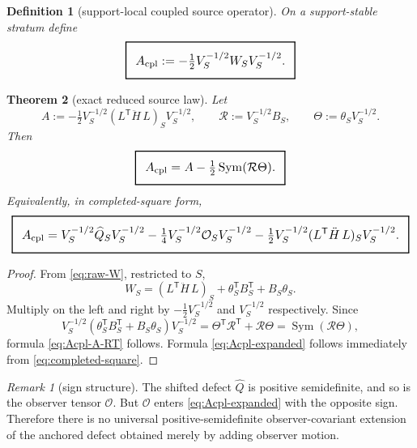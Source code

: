 \documentclass[11pt,a4paper]{article}
\numberwithin{equation}{section}
\DeclareMathOperator{\Sym}{Sym}
\newcommand{\geomboxed}[1]{%
  \setlength{\fboxsep}{8pt}%
  \setlength{\fboxrule}{0.9pt}%
  \fbox{\scalebox{1.10}{$\displaystyle #1$}}%
}
\theoremstyle{thmcompact}
\newtheorem{theorem}{Theorem}[section]
\newtheorem{definition}[theorem]{Definition}
\theoremstyle{remark}
\newtheorem*{remarkplain}{Remark}
\newenvironment{remark}[1][]%
{\begin{remarkbox}\begin{remarkplain}[#1]\normalfont}
{\end{remarkplain}\end{remarkbox}}
\begin{document}
\begin{definition}[support-local coupled source operator]\label{def:Acpl}
On a support-stable stratum define
\begin{equation}
\geomboxed{A_{\mathrm{cpl}}:=-\tfrac12V_S^{-1/2}W_SV_S^{-1/2}.}
\label{eq:Acpl-def}
\end{equation}
\end{definition}

\begin{theorem}[exact reduced source law]\label{thm:exact-reduced-source-law}
Let
\begin{equation}
A:=-\tfrac12V_S^{-1/2}(L^{\mathsf T}\ddot H\,L)_SV_S^{-1/2},
\qquad
\mathcal R:=V_S^{-1/2}B_S,
\qquad
\Theta:=\theta_SV_S^{-1/2}.
\label{eq:ART-defs}
\end{equation}
Then
\begin{equation}
\geomboxed{A_{\mathrm{cpl}}=A-\tfrac12\Sym(\mathcal R\Theta).}
\label{eq:Acpl-A-RT}
\end{equation}
Equivalently, in completed-square form,
\begin{equation}
\geomboxed{A_{\mathrm{cpl}}=V_S^{-1/2}\widehat Q_SV_S^{-1/2}-\tfrac14V_S^{-1/2}\mathcal O_SV_S^{-1/2}-\tfrac12V_S^{-1/2}(L^{\mathsf T}\ddot H\,L)_SV_S^{-1/2}.}
\label{eq:Acpl-expanded}
\end{equation}
\end{theorem}

\begin{proof}
From \eqref{eq:raw-W}, restricted to $S$,
\[
W_S=(L^{\mathsf T}\ddot H\,L)_S+\theta_S^{\mathsf T}B_S^{\mathsf T}+B_S\theta_S.
\]
Multiply on the left and right by $-\tfrac12V_S^{-1/2}$ and $V_S^{-1/2}$ respectively. Since
\[
V_S^{-1/2}(\theta_S^{\mathsf T}B_S^{\mathsf T}+B_S\theta_S)V_S^{-1/2}
=\Theta^{\mathsf T}\mathcal R^{\mathsf T}+\mathcal R\Theta
=\Sym(\mathcal R\Theta),
\]
formula \eqref{eq:Acpl-A-RT} follows. Formula \eqref{eq:Acpl-expanded} follows immediately from \eqref{eq:completed-square}.
\end{proof}

\begin{remark}[sign structure]
The shifted defect $\widehat Q$ is positive semidefinite, and so is the observer tensor $\mathcal O$. But $\mathcal O$ enters \eqref{eq:Acpl-expanded} with the opposite sign. Therefore there is no universal positive-semidefinite observer-covariant extension of the anchored defect obtained merely by adding observer motion.
\end{remark}
\end{document}
